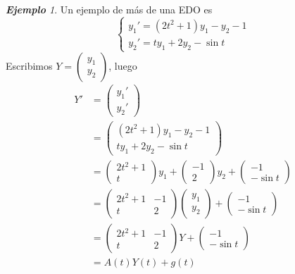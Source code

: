 \documentclass{article}
\theoremstyle{definition}
\theoremstyle{remark}
\newtheorem{example}[theorem]{\textbf{Ejemplo}}
\numberwithin{equation}{section}
\newcommand{\matr}[1]{\begin{pmatrix}#1\end{pmatrix}}
\begin{document}
\begin{example}
    Un ejemplo de más de una EDO es
    \[ \begin{cases}
        y_1' = (2t^2 + 1) y_1 - y_2 - 1 \\
        y_2' = ty_1 + 2y_2 - \sin t
    \end{cases} \]
    Escribimos $Y = \matr{y_1 \\ y_2}$, luego
    \begin{align*}
        Y' &= \matr{y_1' \\ y_2'} \\
        &= \matr{(2t^2 + 1) y_1 - y_2 - 1 \\ ty_1 + 2y_2 - \sin t} \\
        &= \matr{2 t^2 + 1 \\ t} y_1 + \matr{-1 \\ 2} y_2 + \matr{-1 \\ -\sin t} \\
        &= \matr{2 t^2 + 1 & -1 \\ t & 2} \matr{y_1 \\y_2} + \matr{-1 \\ -\sin t} \\
        &= \matr{2 t^2 + 1 & -1 \\ t & 2} Y + \matr{-1 \\ -\sin t} \\
        &= A(t) Y(t) + g(t)
    \end{align*}
\end{example}
\end{document}
